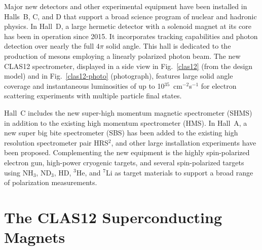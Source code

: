 \documentclass[final,3p,twocolumn]{elsarticle}
\begin{document}
Major new detectors and other experimental equipment have been installed in Halls~B, C, and D that support a
broad science program of nuclear and hadronic physics. In Hall~D, a large hermetic detector with a solenoid magnet
at its core has been in operation since 2015. It incorporates tracking capabilities and photon detection over nearly
the full $4\pi$ solid angle. This hall is dedicated to the production of mesons employing a linearly polarized photon
beam. The new CLAS12 spectrometer, displayed in a side view in Fig.~\ref{clas12} (from the design model) and in
Fig.~\ref{clas12-photo} (photograph), features large solid angle coverage and instantaneous luminosities of up to
10$^{35}$~cm$^{-2}$s$^{-1}$ for electron scattering experiments with multiple particle final states. 

Hall~C includes the new super-high momentum magnetic spectrometer (SHMS) in addition to the existing high
momentum spectrometer (HMS). In Hall~A, a new super big bite spectrometer (SBS) has been added to the
existing high resolution spectrometer pair HRS$^2$, and other large installation experiments have been proposed.
Complementing the new equipment is the highly spin-polarized electron gun, high-power cryogenic targets, and
several spin-polarized targets using NH$_3$, ND$_3$, HD, $^3$He, and $^7$Li as target materials to support a
broad range of polarization measurements.   




\section{The CLAS12 Superconducting Magnets}
\end{document}
